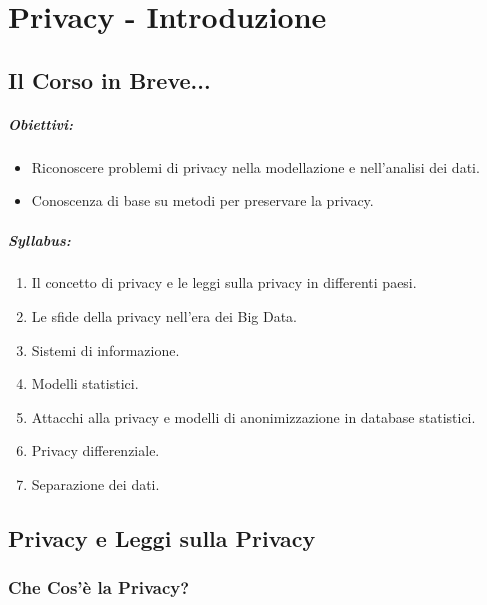 \chapter{Privacy - Introduzione}

\section{Il Corso in Breve...}

\paragraph{Obiettivi:}

\begin{itemize}
  \item Riconoscere problemi di privacy nella modellazione e nell'analisi dei dati. 
  \item Conoscenza di base su metodi per preservare la privacy.
\end{itemize}

\paragraph{Syllabus:}

\begin{enumerate}
  \item Il concetto di privacy e le leggi sulla privacy in differenti paesi. 
  \item Le sfide della privacy nell'era dei Big Data. 
  \item Sistemi di informazione. 
  \item Modelli statistici. 
  \item Attacchi alla privacy e modelli di anonimizzazione in database statistici. 
  \item Privacy differenziale. 
  \item Separazione dei dati.
\end{enumerate}

\section{Privacy e Leggi sulla Privacy}

\subsection{Che Cos'è la Privacy?}


